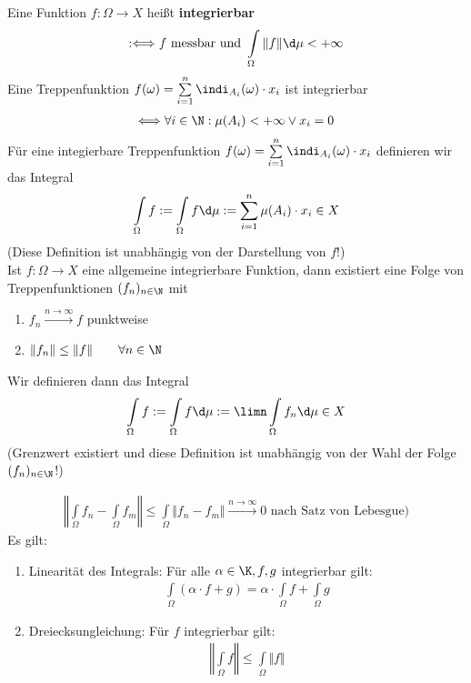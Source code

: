 Eine Funktion $f:\Omega\to X$ heißt \textbf{integrierbar}
\begin{align*}
:\Longleftrightarrow f\text{ messbar und }\int\limits_\Omega\Vert f\Vert\d\mu<+\infty
\end{align*}
Eine Treppenfunktion $f(\omega)=\sum\limits_{i=1}^n\indi_{A_i}(\omega)\cdot x_i$ ist integrierbar
\begin{align*}
\Longleftrightarrow\forall i\in\N: \mu(A_i)<+\infty\vee x_i=0
\end{align*}
Für eine integierbare Treppenfunktion $f(\omega)=\sum\limits_{i=1}^n\indi_{A_i}(\omega)\cdot x_i$ definieren wir das Integral
\begin{align*}
\int\limits_\Omega f:=\int\limits_\Omega f\d\mu:=\sum\limits_{i=1}^n\mu(A_i)\cdot x_i\in X
\end{align*}
(Diese Definition ist unabhängig von der Darstellung von $f$!)\\
Ist $f:\Omega\to X$ eine allgemeine integrierbare Funktion, dann existiert eine Folge von Treppenfunktionen $(f_n)_{n\in\N}$ mit
\begin{enumerate}
\item $f_n\stackrel{n\to\infty}{\longrightarrow} f$ punktweise
\item $\begin{aligned}
\Vert f_n\Vert\leq\Vert f\Vert\qquad\forall n\in\N
\end{aligned}$
\end{enumerate}
Wir definieren dann das Integral 
\begin{align*}
\int\limits_\Omega f:=\int\limits_\Omega f\d\mu:=\limn \int\limits_\Omega f_n\d\mu\in X
\end{align*}
(Grenzwert existiert und diese Definition ist unabhängig von der Wahl der Folge $(f_n)_{n\in\N}$!)

\begin{align*}
\left\Vert\int\limits_\Omega f_n-\int\limits_\Omega f_m\right\Vert\leq\int\limits_\Omega\big\Vert f_n-f_m\big\Vert\stackrel{n\to\infty}{\longrightarrow}0\text{ nach Satz von Lebesgue)}
\end{align*}
Es gilt:
\begin{enumerate}[label=(\arabic*)]
\item Linearität des Integrals: Für alle $\alpha\in\K,f,g$ integrierbar gilt:
\begin{align*}
\int\limits_\Omega(\alpha\cdot f+g)=\alpha\cdot\int\limits_\Omega f+\int\limits_\Omega g
\end{align*}
\item Dreiecksungleichung: Für $f$ integrierbar gilt:
\begin{align*}
\left\Vert\int\limits_\Omega f\right\Vert\leq\int\limits_\Omega\Vert f\Vert
\end{align*}
\end{enumerate}

